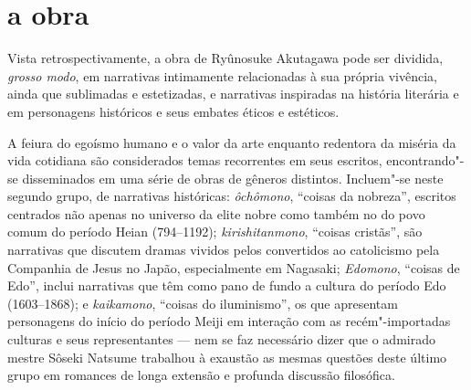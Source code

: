 \section*{a obra}

Vista retrospectivamente, a obra de Ryûnosuke Akutagawa  pode ser
dividida, \textit{grosso modo}, em narrativas intimamente relacionadas
à sua própria vivência, ainda que sublimadas e estetizadas, e
narrativas inspiradas na história literária e em personagens históricos
e seus embates éticos e estéticos.

A feiura do egoísmo humano e o valor da arte enquanto redentora da
miséria da vida cotidiana são considerados temas recorrentes em seus
escritos, encontrando"-se disseminados em uma série de obras de gêneros
distintos. Incluem"-se neste segundo grupo, de narrativas históricas:
\textit{ôchômono}, ``coisas da nobreza'', escritos centrados 
não apenas no universo da elite nobre como também no do povo
comum do período Heian (794--1192); \textit{kirishitanmono}, ``coisas cristãs'', são narrativas que discutem dramas vividos pelos 
convertidos ao catolicismo pela Companhia de Jesus no Japão, especialmente
em Nagasaki; \textit{Edomono}, ``coisas de Edo'', inclui
narrativas que têm como pano de fundo a cultura do período Edo
(1603--1868); e \textit{kaikamono}, ``coisas do iluminismo'', 
os que apresentam personagens do início do período Meiji em
interação com as recém"-importadas culturas e seus representantes --- nem
se faz necessário dizer que o admirado mestre Sôseki Natsume trabalhou
à exaustão as mesmas questões deste último grupo em romances de longa
extensão e profunda discussão filosófica.

